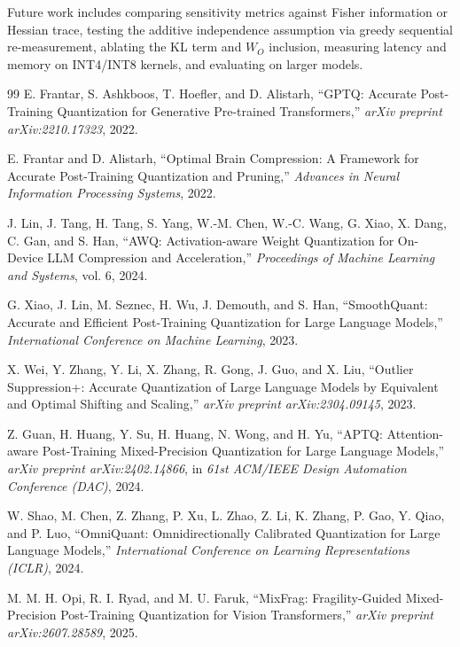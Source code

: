 \documentclass[10pt,twocolumn,letterpaper]{article}
\begin{document}
Future work includes comparing sensitivity metrics against Fisher information or Hessian trace, testing the additive independence assumption via greedy sequential re-measurement, ablating the KL term and $W_O$ inclusion, measuring latency and memory on INT4/INT8 kernels, and evaluating on larger models.

\begin{thebibliography}{99}
\footnotesize
\baselineskip=8pt
E. Frantar, S. Ashkboos, T. Hoefler, and D. Alistarh, ``GPTQ: Accurate Post-Training Quantization for Generative Pre-trained Transformers,'' \textit{arXiv preprint arXiv:2210.17323}, 2022.

E. Frantar and D. Alistarh, ``Optimal Brain Compression: A Framework for Accurate Post-Training Quantization and Pruning,'' \textit{Advances in Neural Information Processing Systems}, 2022.

J. Lin, J. Tang, H. Tang, S. Yang, W.-M. Chen, W.-C. Wang, G. Xiao, X. Dang, C. Gan, and S. Han, ``AWQ: Activation-aware Weight Quantization for On-Device LLM Compression and Acceleration,'' \textit{Proceedings of Machine Learning and Systems}, vol. 6, 2024.

G. Xiao, J. Lin, M. Seznec, H. Wu, J. Demouth, and S. Han, ``SmoothQuant: Accurate and Efficient Post-Training Quantization for Large Language Models,'' \textit{International Conference on Machine Learning}, 2023.

X. Wei, Y. Zhang, Y. Li, X. Zhang, R. Gong, J. Guo, and X. Liu, ``Outlier Suppression+: Accurate Quantization of Large Language Models by Equivalent and Optimal Shifting and Scaling,'' \textit{arXiv preprint arXiv:2304.09145}, 2023.

Z. Guan, H. Huang, Y. Su, H. Huang, N. Wong, and H. Yu, ``APTQ: Attention-aware Post-Training Mixed-Precision Quantization for Large Language Models,'' \textit{arXiv preprint arXiv:2402.14866}, in \textit{61st ACM/IEEE Design Automation Conference (DAC)}, 2024.

W. Shao, M. Chen, Z. Zhang, P. Xu, L. Zhao, Z. Li, K. Zhang, P. Gao, Y. Qiao, and P. Luo, ``OmniQuant: Omnidirectionally Calibrated Quantization for Large Language Models,'' \textit{International Conference on Learning Representations (ICLR)}, 2024.

M. M. H. Opi, R. I. Ryad, and M. U. Faruk, ``MixFrag: Fragility-Guided Mixed-Precision Post-Training Quantization for Vision Transformers,'' \textit{arXiv preprint arXiv:2607.28589}, 2025.


\end{thebibliography}
\end{document}
